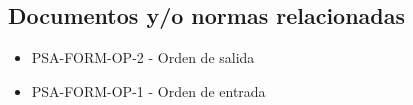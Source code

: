 
\subsection{Documentos y/o normas relacionadas}

\begin{itemize}
	\item PSA-FORM-OP-2 - Orden de salida
	\item PSA-FORM-OP-1 - Orden de entrada
\end{itemize}

